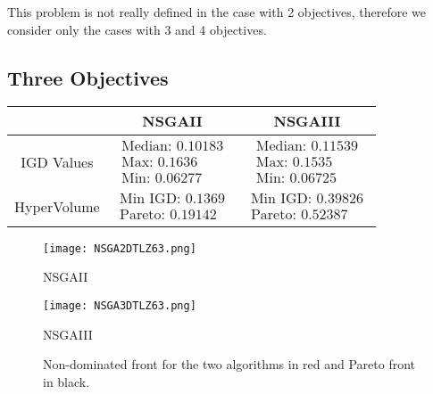 \documentclass[a4paper,11pt]{article}
\numberwithin{equation}{section}
\begin{document}
This problem is not really defined in the case with 2 objectives, therefore we consider only the cases with 3 and 4 objectives.

\subsection{Three Objectives}

\begin{table}[!h]
\begin{center}
\begin{tabular}{|c|c|c|}
\hline
 & NSGAII & NSGAIII \\
\hline
IGD Values &$\begin{array}{l}
\text{Median: 0.10183}\\
\text{Max: 0.1636}\\
\text{Min: 0.06277}\end{array}$&
$\begin{array}{l}
\text{Median: 0.11539}\\
\text{Max: 0.1535}\\
\text{Min: 0.06725}\end{array}$\\
\hline
HyperVolume &$\begin{array}{l}
\text{Min IGD: 0.1369}\\
\text{Pareto: 0.19142}\end{array}$&
$\begin{array}{l}
\text{Min IGD: 0.39826}\\
\text{Pareto: 0.52387}\end{array}$\\
\hline
\end{tabular}
\end{center}
\end{table}

\begin{figure}[h]
        \centering
        \begin{minipage}{0.48\textwidth} 
            \centering
            \texttt{[image: NSGA2DTLZ63.png]} 
            \caption*{NSGAII}
        \end{minipage}
        \hfill
        \begin{minipage}{0.48\textwidth} 
            \centering
            \texttt{[image: NSGA3DTLZ63.png]} 
            \caption*{NSGAIII} 
        \end{minipage}
        \caption{Non-dominated front for the two algorithms in red and Pareto front in black. } 
    \end{figure}
\end{document}
